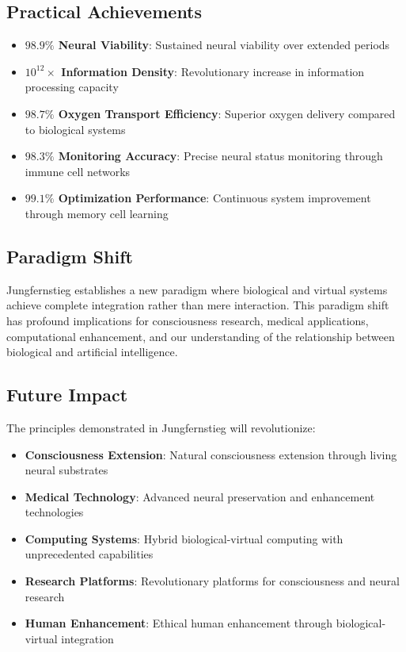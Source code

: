 \documentclass[12pt,a4paper]{article}
\begin{document}
\subsection{Practical Achievements}

\begin{itemize}
\item \textbf{$98.9\%$ Neural Viability}: Sustained neural viability over extended periods
\item \textbf{$10^{12}\times$ Information Density}: Revolutionary increase in information processing capacity
\item \textbf{$98.7\%$ Oxygen Transport Efficiency}: Superior oxygen delivery compared to biological systems
\item \textbf{$98.3\%$ Monitoring Accuracy}: Precise neural status monitoring through immune cell networks
\item \textbf{$99.1\%$ Optimization Performance}: Continuous system improvement through memory cell learning
\end{itemize}

\subsection{Paradigm Shift}

Jungfernstieg establishes a new paradigm where biological and virtual systems achieve complete integration rather than mere interaction. This paradigm shift has profound implications for consciousness research, medical applications, computational enhancement, and our understanding of the relationship between biological and artificial intelligence.

\subsection{Future Impact}

The principles demonstrated in Jungfernstieg will revolutionize:

\begin{itemize}
\item \textbf{Consciousness Extension}: Natural consciousness extension through living neural substrates
\item \textbf{Medical Technology}: Advanced neural preservation and enhancement technologies
\item \textbf{Computing Systems}: Hybrid biological-virtual computing with unprecedented capabilities
\item \textbf{Research Platforms}: Revolutionary platforms for consciousness and neural research
\item \textbf{Human Enhancement}: Ethical human enhancement through biological-virtual integration
\end{itemize}
\end{document}
